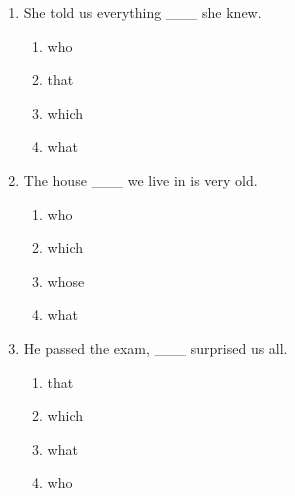 \documentclass[11pt,a4paper]{ctexart}
\begin{document}
\begin{enumerate}[leftmargin=*,itemsep=4pt]
\begin{enumerate}[label=\Alph*.,leftmargin=2em,itemsep=1pt,topsep=2pt]
\item where
\end{enumerate}
\item She told us everything \_\_\_ she knew.
\begin{enumerate}[label=\Alph*.,leftmargin=2em,itemsep=1pt,topsep=2pt]
\item who
\item that
\item which
\item what
\end{enumerate}
\item The house \_\_\_ we live in is very old.
\begin{enumerate}[label=\Alph*.,leftmargin=2em,itemsep=1pt,topsep=2pt]
\item who
\item which
\item whose
\item what
\end{enumerate}
\item He passed the exam, \_\_\_ surprised us all.
\begin{enumerate}[label=\Alph*.,leftmargin=2em,itemsep=1pt,topsep=2pt]
\item that
\item which
\item what
\item who
\end{enumerate}
\end{enumerate}

\newpage
\end{document}
